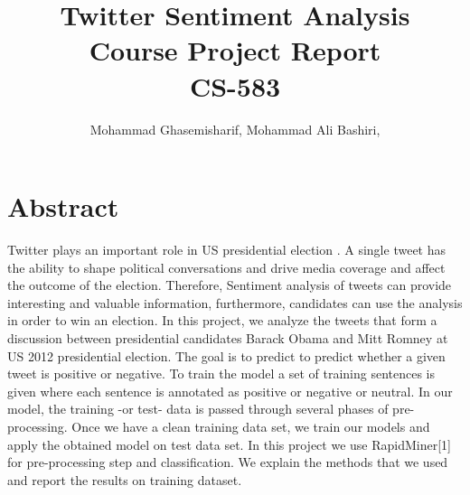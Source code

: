 \documentclass[letterpaper, 12pt]{article}
\title{Twitter Sentiment Analysis\\
Course Project Report\\
CS-583}
\author{
Mohammad Ghasemisharif, 
Mohammad Ali Bashiri, 
}
\begin{document}
\maketitle
\newpage

\section{Abstract}


Twitter plays an important role in US presidential election . A single tweet has the ability to shape political conversations and drive media coverage and affect the outcome of the election. Therefore, Sentiment analysis of tweets can provide interesting and valuable information, furthermore,  candidates can use the analysis in order to win an election. In this project, we analyze the tweets that form a discussion between presidential candidates Barack Obama and Mitt Romney at US 2012 presidential election. The goal is to predict to predict whether a given tweet is positive or negative. To train the model a set of training sentences is given where each sentence is annotated as positive or negative or neutral. In our model, the training -or test- data  is passed through several phases of pre-processing. Once we have a clean training data set, we train our models and apply the obtained model on test data set. In this project we use RapidMiner[1] for  pre-processing  step and classification. We explain the methods that we used and report the results on training dataset. 





\vspace*{10pt}
\end{document}
